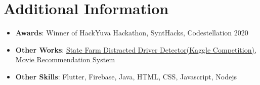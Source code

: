 \documentclass[letterpaper,11pt]{article}
\newcommand{\resumeItem}[2]{
  \item\small{
    \textbf{#1}{: #2 \vspace{-2pt}}
  }
}
\newcommand{\resumeSubItem}[2]{\resumeItem{#1}{#2}\vspace{-4pt}}
\newcommand{\resumeSubHeadingListStart}{\begin{itemize}[leftmargin=*]}
\newcommand{\resumeSubHeadingListEnd}{\end{itemize}}
\begin{document}
\section{Additional Information}
 \resumeSubHeadingListStart
   \resumeSubItem{Awards}
     {Winner of HackYuva Hackathon, SyntHacks, Codestellation 2020}
   \resumeSubItem{Other Works}
     {{\href{https://github.com/savss624/State-Farm-Distracted-Driver-Detector}{State Farm Distracted Driver Detector}}{\href{https://www.kaggle.com/c/state-farm-distracted-driver-detection/overview}{(Kaggle Competition)}}, {\href{https://github.com/savss624/Movie-Recommendation}{Movie Recommendation System}}}
   \resumeSubItem{Other Skills}
     {Flutter, Firebase, Java, HTML, CSS, Javascript, Nodejs}
\resumeSubHeadingListEnd

\end{document}
